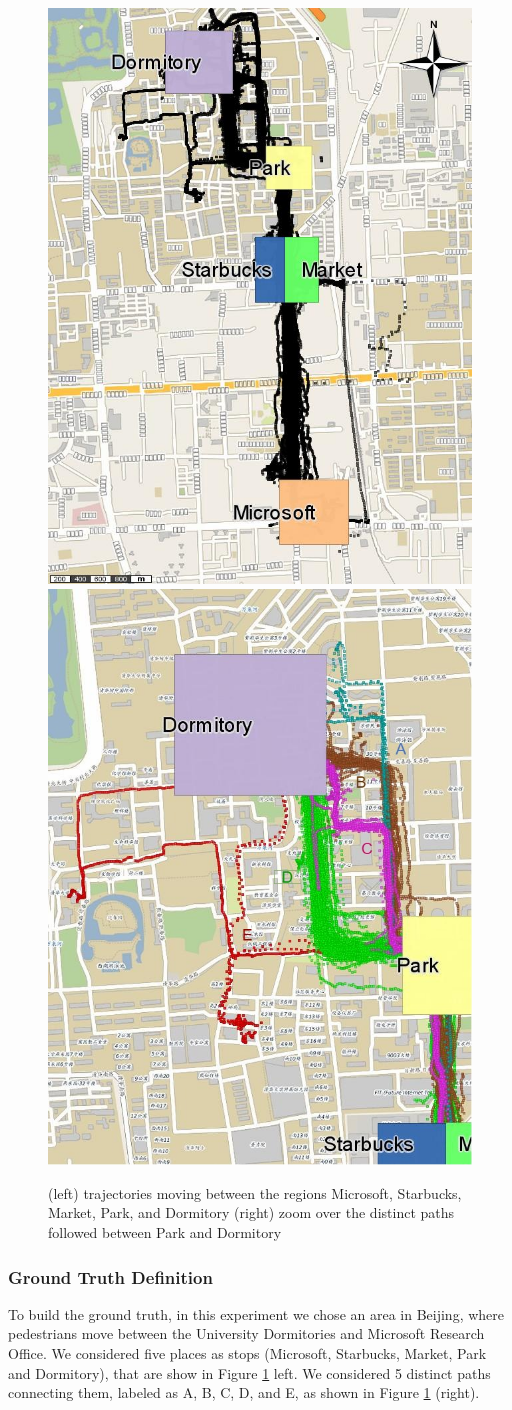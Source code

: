 \documentclass[12pt]{article}
\begin{document}
\begin{figure}[ht!]
\centering
\centerline{
\includegraphics[width=.5\textwidth]{Images/Geolife-Trajectories-painted}
\includegraphics[width=.5\textwidth]{Images/Geolife-Paths-painted}
}
\caption{(left) trajectories moving between the regions Microsoft, Starbucks, Market, Park, and Dormitory (right) zoom over the distinct paths followed between Park and Dormitory}
\label{fig:geolife_map_rois}
\end{figure}

\subsubsection{Ground Truth Definition}
To build the ground truth, in this experiment we chose an area in Beijing, where pedestrians move between the University Dormitories and Microsoft Research Office. We considered five places as stops (Microsoft, Starbucks, Market, Park and Dormitory), that are show in Figure \ref{fig:geolife_map_rois} left. We considered 5 distinct paths connecting them, labeled as A, B, C, D, and E, as shown in Figure \ref{fig:geolife_map_rois} (right).
\end{document}
